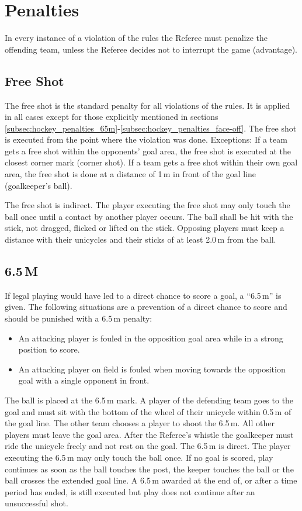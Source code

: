 \section{Penalties}

In every instance of a violation of the rules the Referee must penalize the offending team, unless the Referee decides not to interrupt the game (advantage).

\subsection{Free Shot}

The free shot is the standard penalty for all violations of the rules.
It is applied in all cases except for those explicitly mentioned in sections \ref{subsec:hockey_penalties_65m}-\ref{subsec:hockey_penalties_face-off}.
The free shot is executed from the point where the violation was done.
Exceptions: If a team gets a free shot within the opponents' goal area, the free shot is executed at the closest corner mark (corner shot).
If a team gets a free shot within their own goal area, the free shot is done at a distance of 1\,m in front of the goal line (goalkeeper's ball).

The free shot is indirect.
The player executing the free shot may only touch the ball once until a contact by another player occurs.
The ball shall be hit with the stick, not dragged, flicked or lifted on the stick.
Opposing players must keep a distance with their unicycles and their sticks of at least 2.0\,m from the ball.

\subsection{6.5\,M \label{subsec:hockey_penalties_65m}}

If legal playing would have led to a direct chance to score a goal, a ``6.5\,m'' is given.
The following situations are a prevention of a direct chance to score and should be punished with a 6.5\,m penalty:
\begin{itemize}
\item An attacking player is fouled in the opposition goal area while in a strong position to score.
\item An attacking player on field is fouled when moving towards the opposition goal with a single opponent in front.
\end{itemize}
The ball is placed at the 6.5\,m mark.
A player of the defending team goes to the goal and must sit with the bottom of the wheel of their unicycle within 0.5\,m of the goal line.
The other team chooses a player to shoot the 6.5\,m.
All other players must leave the goal area.
After the Referee's whistle the goalkeeper must ride the unicycle freely and not rest on the goal.
The 6.5\,m is direct.
The player executing the 6.5\,m may only touch the ball once.
If no goal is scored, play continues as soon as the ball touches the post, the keeper touches the ball or the ball crosses the extended goal line.
A 6.5\,m awarded at the end of, or after a time period has ended, is still executed but play does not continue after an unsuccessful shot.


